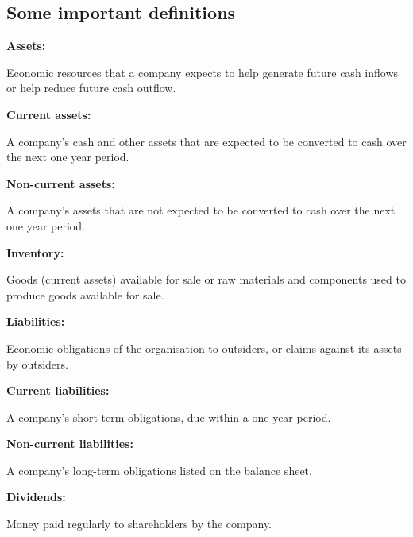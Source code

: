 \subsection{Some important definitions}
\textbf{Assets:}
\begin{quoting}
    Economic resources that a company expects to help generate future cash inflows or help reduce future cash outflow.
\end{quoting}
\textbf{Current assets:}
\begin{quoting}
    A company's cash and other assets that are expected to be converted to cash over the next one year period.
\end{quoting}
\textbf{Non-current assets:}
\begin{quoting}
    A company's assets that are not expected to be converted to cash over the next one year period.
\end{quoting}
\textbf{Inventory:}
\begin{quoting}
    Goods (current assets) available for sale or raw materials and components used to produce goods available for sale.
\end{quoting}
\textbf{Liabilities:}
\begin{quoting}
    Economic obligations of the organisation to outsiders, or claims against its assets by outsiders.
\end{quoting}
\textbf{Current liabilities:}
\begin{quoting}
    A company's short term obligations, due within a one year period.
\end{quoting}
\textbf{Non-current liabilities:}
\begin{quoting}
    A company's long-term obligations listed on the balance sheet.
\end{quoting}
\textbf{Dividends:}
\begin{quoting}
    Money paid regularly to shareholders by the company.
\end{quoting}
